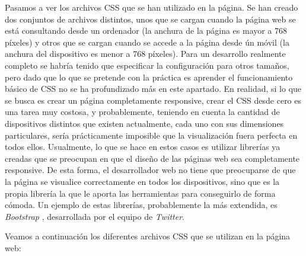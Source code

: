 \documentclass[11pt]{article}
\theoremstyle{plain}
\theoremstyle{definition}
\begin{document}
Pasamos a ver los archivos CSS que se han utilizado en la página. Se
han creado dos conjuntos de archivos distintos, unos que se cargan
cuando la página web se está consultando desde un ordenador (la
anchura de la página es mayor a 768 píxeles) y otros que se cargan
cuando se accede a la página desde ún móvil (la anchura del
dispositivo es menor a 768 píxeles). Para un desarrollo realmente
completo se habría tenido que especificar la configuración para otros
tamaños, pero dado que lo que se pretende con la práctica es aprender
el funcionamiento básico de CSS no se ha profundizado más en este
apartado. En realidad, si lo que se busca es crear un página
completamente responsive, crear el CSS desde cero es una tarea muy
costosa, y probablemente, teniendo en cuenta la cantidad de
dispositivos distintos que existen actualmente, cada uno con sus
dimensiones particulares, sería prácticamente imposible que la
visualización fuera perfecta en todos ellos. Usualmente, lo que se
hace en estos casos es utilizar librerías ya creadas que se preocupan
en que el diseño de las páginas web sea completamente responsive. De
esta forma, el desarrollador web no tiene que preocuparse de que la
página se visualice correctamente en todos los dispositivos, sino que
es la propia librería la que le aporta las herramientas para
conseguirlo de forma cómoda. Un ejemplo de estas librerías,
probablemente la más extendida, es \textit{Bootstrap}
\cite{bootstrap}, desarrollada por el equipo de \textit{Twitter}.

Veamos a continuación los diferentes archivos CSS que se utilizan en
la página web:
\end{document}
